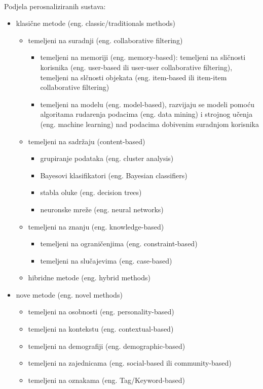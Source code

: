 \documentclass[a4paper,oneside,12pt]{memoir} %
\begin{document}
%
\\ Podjela perosnaliziranih sustava:
\begin{itemize}[topsep=2pt]
\setlength{\parskip}{0pt}
\item klasične metode (eng. classic/traditionals methods)
  \begin{itemize}[topsep=2pt]
  \setlength{\parskip}{0pt}
  \item temeljeni na suradnji (eng. collaborative filtering)
    \begin{itemize}[topsep=2pt]
    \setlength{\parskip}{0pt}
    \item temeljeni na memoriji (eng. memory-based): temeljeni na sličnosti korisnika (eng. user-based ili user-user collaborative filtering), temeljeni na slčnosti objekata (eng. item-based ili item-item collaborative filtering)
    \item temeljeni na modelu (eng. model-based), razvijaju se modeli pomoću algoritama rudarenja podacima (eng. data mining) i strojnog učenja (eng. machine learning) nad podacima dobivenim suradnjom korisnika
    \end{itemize}
  \item temeljeni na sadržaju (content-based)
  	\begin{itemize}[topsep=2pt]
	\setlength{\parskip}{0pt}
    \item grupiranje podataka (eng. cluster analysis)
	\item Bayesovi klasifikatori (eng. Bayesian classifiers)
	\item stabla oluke (eng. decision trees)
    \item neuronske mreže (eng. neural networks)
	\end{itemize}
  \item temeljeni na znanju (eng. knowledge-based)
    \begin{itemize}[topsep=2pt]
	\setlength{\parskip}{0pt}
    \item temeljeni na ograničenjima (eng. constraint-based)
	\item temeljeni na slučajevima (eng. case-based)
	\end{itemize}
  \item hibridne metode (eng. hybrid methods)
  \end{itemize}
\item nove metode (eng. novel methods)
    \begin{itemize}[topsep=2pt]
	\setlength{\parskip}{0pt}
    \item temeljeni na osobnosti (eng. personality-based)
	\item temeljeni na kontekstu (eng. contextual-based)
    \item temeljeni na demografiji (eng. demographic-based)
    \item temeljeni na zajednicama (eng. social-based ili community-based)
    \item temeljeni na oznakama (eng. Tag/Keyword-based)
	\end{itemize}
\end{itemize}
%
\end{document}

